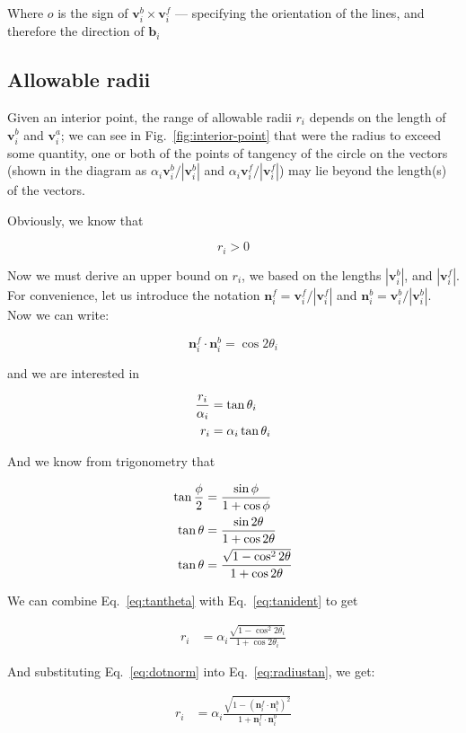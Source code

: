 \documentclass{article}
\begin{document}
Where $o$ is the sign of $\mathbf{v}^{b}_{i}\times\mathbf{v}^{f}_{i}$ --- specifying the orientation of the lines, and therefore the direction of $\mathbf{b}_{i}$

\subsection{Allowable radii}

Given an interior point, the range of allowable radii $r_{i}$ depends on the length of $\mathbf{v}^{b}_{i}$ and $\mathbf{v}^{a}_{i}$; we can see in Fig.~\ref{fig:interior-point} that were the radius to exceed some quantity, one or both of the points of tangency of the circle on the vectors (shown in the diagram as $\alpha_i\mathbf{v}^b_i/|\mathbf{v}^b_i|$ and $\alpha_i\mathbf{v}^f_i/|\mathbf{v}^f_i|$) may lie beyond the length(s) of the vectors.

Obviously, we know that

\begin{equation}
  \label{eq:rlow}
  r_i > 0
\end{equation}

Now we must derive an upper bound on $r_{i}$, we based on the lengths $|\mathbf{v}^b_i|$, and $|\mathbf{v}^f_i|$.  For convenience, let us introduce the notation $\mathbf{n}^{f}_{i} = \mathbf{v}^f_i/|\mathbf{v}^f_i|$ and $\mathbf{n}^{b}_{i} = \mathbf{v}^b_i/|\mathbf{v}^b_i|$.  Now we can write:

\begin{equation}
  \label{eq:dotnorm}
  \mathbf{n}^{f}_{i} \cdot \mathbf{n}^{b}_{i} = \cos 2\theta_i
\end{equation}

and we are interested in

\begin{align}
  \notag
  \frac{r_i}{\alpha_{i}} &= \tan \theta_i\\
  \label{eq:tantheta}
  r_i &= \alpha_{i}\tan \theta_i
\end{align}

And we know from trigonometry that

\begin{align}
  \notag
  \tan \frac{\phi}{2} &= \frac{\sin\phi}{1+\cos\phi}\\
  \notag
  \tan \theta &= \frac{\sin 2\theta}{1+\cos 2\theta}\\
  \label{eq:tanident}
  \tan \theta &= \frac{\sqrt{1-\cos^{2} 2\theta}}{1+\cos 2\theta}
\end{align}

We can combine Eq.~\eqref{eq:tantheta} with Eq.~\eqref{eq:tanident} to get

\begin{align}
  \label{eq:radiustan}
  r_{i} &= \alpha_i\frac{\sqrt{1-\cos^{2} 2\theta_i}}{1+\cos 2\theta_i}
\end{align}

And substituting Eq.~\eqref{eq:dotnorm} into Eq.~\eqref{eq:radiustan}, we get:

\begin{align}
  \label{eq:radius-alpha}
  r_{i} &= \alpha_i\frac{\sqrt{1-\left(\mathbf{n}^f_i\cdot \mathbf{n}^b_i\right)^{2}}}{1+\mathbf{n}^f_i\cdot \mathbf{n}^b_i}
\end{align}
\end{document}
